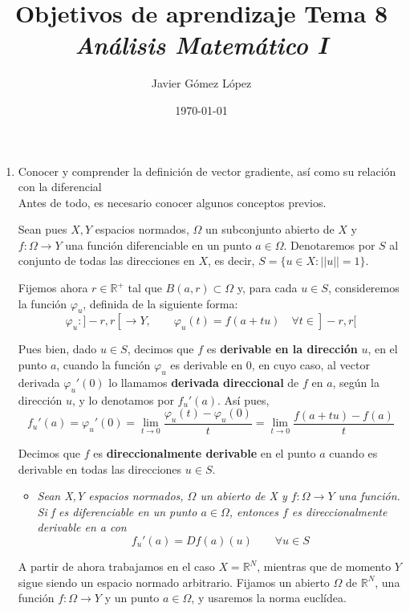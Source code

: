 \documentclass[a4paper, 12pt]{article}
\title{\textbf{Objetivos de aprendizaje Tema 8} \\ \textit{Análisis Matemático I}}
\author{Javier Gómez López}
\date{\today}
\begin{document}
\maketitle

\begin{enumerate}[label=\textbf{\arabic*}.]

\item Conocer y comprender la definición de vector gradiente, así como su relación con la diferencial \\

Antes de todo, es necesario conocer algunos conceptos previos.

Sean pues \(X,Y\) espacios normados, \(\Omega\) un subconjunto abierto de \(X\) y \(f: \Omega \to Y\) una función diferenciable en un punto \(a \in \Omega\). Denotaremos por \(S\) al conjunto de todas las direcciones en \(X\), es decir, \(S = \{ u \in X : ||u|| = 1\}\).

Fijemos ahora \(r \in \mathbb{R}^+\) tal que \(B(a,r) \subset \Omega\) y, para cada \(u \in S\), consideremos la función \(\varphi_u\), definida de la siguiente forma:
\[
	\varphi_u : ]-r,r[ \to Y, \qquad \varphi_u (t) = f(a + tu) \quad \forall t \in ]-r,r[
\]

Pues bien, dado \(u \in S\), decimos que \(f\) es \textbf{derivable en la dirección} \(u\), en el punto \(a\), cuando la función \(\varphi_u\) es derivable en 0, en cuyo caso, al vector derivada \(\varphi_u'(0)\) lo llamamos \textbf{derivada direccional} de \(f\) en \(a\), según la dirección \(u\), y lo denotamos por \(f_u'(a)\). Así pues,
\[
	f_u'(a) = \varphi_u ' (0) = \lim_{t \to 0} \frac{\varphi_u (t) - \varphi_u (0)}{t} = \lim_{t \to 0} \frac{f(a+tu) - f(a)}{t}
\]

Decimos que \(f\) es \textbf{direccionalmente derivable} en el punto \(a\) cuando es derivable en todas las direcciones \(u \in S\).

\begin{itemize}
	\item \textit{Sean X,Y espacios normados, \(\Omega\) un abierto de X y \(f : \Omega \to Y\) una función. Si f es diferenciable en un punto \(a \in \Omega\), entonces \(f\) es direccionalmente derivable en a con}
	\[
		f_u'(a) = Df(a)(u) \qquad \forall u  \in S
	\]
\end{itemize}

\par

A partir de ahora trabajamos en el caso \(X = \mathbb{R}^N\), mientras que de momento \(Y\) sigue siendo un espacio normado arbitrario. Fijamos un abierto \(\Omega\) de \(\mathbb{R}^N\), una función \(f : \Omega \to Y\) y un punto \(a \in \Omega\), y usaremos la norma euclídea.


\end{enumerate}
\end{document}
